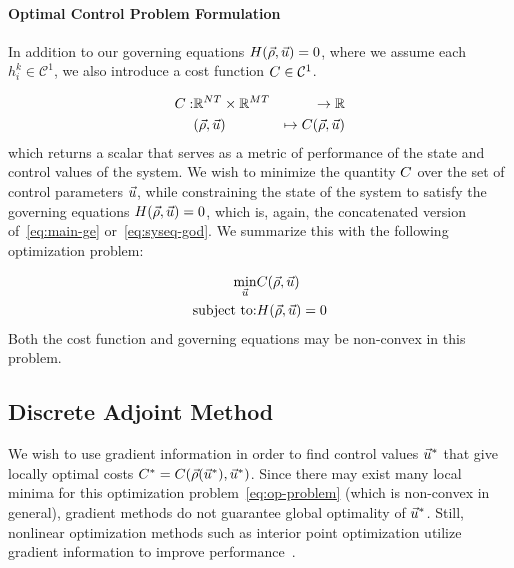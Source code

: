 \paragraph{Optimal Control Problem Formulation\label{par:Optimization-Problem}}

In addition to our governing equations $\sys\left(\state,\control\right)=0$, where we assume each $h_i^k \in \mathcal{C}^1$,
we also introduce a cost function $C \in \mathcal{C}^1$.

\begin{eqnarray*}
\cost: & \mathbb{R}^{\nlinks T}\times\mathbb{R}^{\ncontrols T} & \rightarrow\mathbb{R}\\
& \left(\state,\control\right) & \mapsto\cost\left(\state,\control\right)
\end{eqnarray*}
which returns a scalar that serves as a metric of performance of the
state and control values of the system. We wish to minimize the quantity
$C$ over the set of control parameters $\vec{u}$, while constraining
the state of the system to satisfy the governing equations $\sys\left(\state,\control\right)=0$,
which is, again, the concatenated version of~\eqref{eq:main-ge} or~\eqref{eq:syseq-god}.
We summarize this with the following optimization problem:

\begin{eqnarray}
\underset{\control}{\min} & \cost\left(\state,\control\right)\nonumber \\
\text{subject to:} & \sys\left(\state,\control\right)=0\label{eq:op-problem}
\end{eqnarray}
Both the cost function and governing equations may be non-convex in
this problem.


\subsection{Discrete Adjoint Method}
\label{sec:discrete-adjoint-method}

We wish to use gradient information in order to find control values
$\vec{u}^{*}$ that give locally optimal costs $\cost^{*}=\cost\left(\state\left(\control^{*}\right),\control^{*}\right)$.
Since there may exist many local minima for this optimization problem~\eqref{eq:op-problem}
(which is non-convex in general), gradient\emph{ }methods do not guarantee
global optimality of $\vec{u}^{*}$\emph{. }Still, nonlinear optimization
methods such as interior point optimization utilize gradient information
to improve performance~\cite{Andreas2005}.


